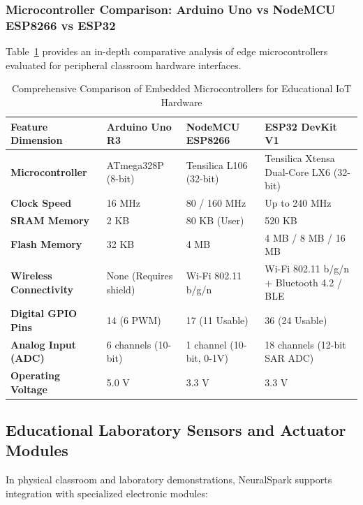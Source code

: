 \subsubsection{Microcontroller Comparison: Arduino Uno vs NodeMCU ESP8266 vs ESP32}
Table~\ref{tab:mcu_detailed_comparison} provides an in-depth comparative analysis of edge microcontrollers evaluated for peripheral classroom hardware interfaces.

\begin{table}[H]
\centering
\caption{Comprehensive Comparison of Embedded Microcontrollers for Educational IoT Hardware}
\label{tab:mcu_detailed_comparison}
\small
\begin{tabularx}{\textwidth}{p{3.2cm} p{3.0cm} p{3.2cm} X}
\toprule
\textbf{Feature Dimension} & \textbf{Arduino Uno R3} & \textbf{NodeMCU ESP8266} & \textbf{ESP32 DevKit V1} \\
\midrule
\textbf{Microcontroller} & ATmega328P (8-bit) & Tensilica L106 (32-bit) & Tensilica Xtensa Dual-Core LX6 (32-bit) \\
\textbf{Clock Speed} & 16 MHz & 80 / 160 MHz & Up to 240 MHz \\
\textbf{SRAM Memory} & 2 KB & 80 KB (User) & 520 KB \\
\textbf{Flash Memory} & 32 KB & 4 MB & 4 MB / 8 MB / 16 MB \\
\textbf{Wireless Connectivity} & None (Requires shield) & Wi-Fi 802.11 b/g/n & Wi-Fi 802.11 b/g/n + Bluetooth 4.2 / BLE \\
\textbf{Digital GPIO Pins} & 14 (6 PWM) & 17 (11 Usable) & 36 (24 Usable) \\
\textbf{Analog Input (ADC)} & 6 channels (10-bit) & 1 channel (10-bit, 0-1V) & 18 channels (12-bit SAR ADC) \\
\textbf{Operating Voltage} & 5.0 V & 3.3 V & 3.3 V \\
\bottomrule
\end{tabularx}
\end{table}

\subsection{Educational Laboratory Sensors and Actuator Modules}
In physical classroom and laboratory demonstrations, NeuralSpark supports integration with specialized electronic modules:

